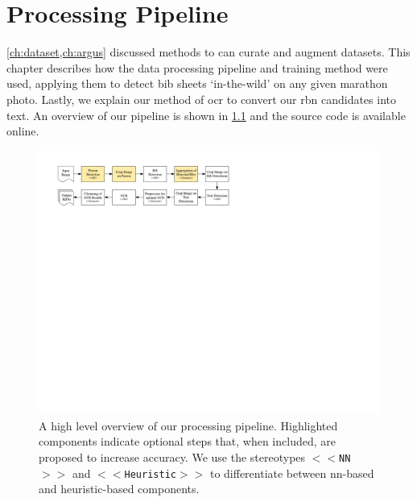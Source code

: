 \chapter{Processing Pipeline}
\label{ch:processing_pipeline}


\cref{ch:dataset,ch:argus} discussed methods to can curate and augment datasets. This chapter describes how the data processing pipeline and training method were used, applying them to detect bib sheets `in-the-wild' on any given marathon photo. Lastly, we explain our method of \gls{ocr} to convert our \gls{rbn} candidates into text.  An overview of our pipeline is shown in \cref{fig:processing_pipeline:pipeline} and the source code is available online.


\begin{figure}[h]
  \centering
  \includegraphics[width=\textwidth]{images/processing/pipeline}
  \caption[Overview of our processing pipeline]{A high level overview of our processing pipeline. Highlighted components indicate optional steps that, when included, are proposed to increase accuracy. We use the stereotypes \texttt{$<<$NN$>>$} and \texttt{$<<$Heuristic$>>$} to differentiate between \gls{nn}-based and heuristic-based components.}
  \label{fig:processing_pipeline:pipeline}
\end{figure}

